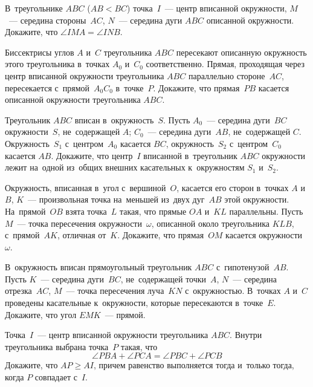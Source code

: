 \begin{problems}

\item
В~треугольнике $ABC$ ($AB < BC$) точка~$I$~--- центр вписанной окружности,
$M$~--- середина стороны~$AC$, $N$~--- середина дуги $ABC$ описанной
окружности.
Докажите, что $\angle IMA = \angle INB$.

\item
Биссектрисы углов $A$ и~$C$ треугольника $ABC$ пересекают описанную окружность
этого треугольника в~точках $A_0$ и~$C_0$ соответственно.
Прямая, проходящая через центр вписанной окружности треугольника $ABC$
параллельно стороне~$AC$, пересекается с~прямой~$A_0 C_0$ в~точке~$P$.
Докажите, что прямая~$PB$ касается описанной окружности треугольника $ABC$.

\item
Треугольник $ABC$ вписан в~окружность~$S$.
Пусть $A_0$~--- середина дуги~$BC$ окружности~$S$, не~содержащей $A$;
$C_0$~--- середина дуги~$AB$, не~содержащей $C$.
Окружность~$S_1$ с~центром~$A_0$ касается $BC$,
окружность~$S_2$ с~центром~$C_0$ касается $AB$.
Докажите, что центр~$I$ вписанной в~треугольник $ABC$ окружности лежит на~одной
из~общих внешних касательных к~окружностям $S_1$ и~$S_2$.

\item
Окружность, вписанная в~угол с~вершиной~$O$, касается его сторон в~точках
$A$ и~$B$,
$K$~--- произвольная точка на~меньшей из~двух дуг~$AB$ этой окружности.
На~прямой~$OB$ взята точка~$L$ такая, что прямые $OA$ и~$KL$ параллельны.
Пусть $M$~--- точка пересечения окружности~$\omega$, описанной около
треугольника $KLB$, с~прямой~$AK$, отличная от~$K$.
Докажите, что прямая~$OM$ касается окружности~$\omega$.

\item
В~окружность вписан прямоугольный треугольник $ABC$ с~гипотенузой~$AB$.
Пусть $K$~--- середина дуги~$BC$, не~содержащей точки~$A$,
$N$~--- середина отрезка~$AC$,
$M$~--- точка пересечения луча~$KN$ с~окружностью.
В~точках $A$ и~$C$ проведены касательные к~окружности, которые пересекаются
в~точке~$E$.
Докажите, что угол $EMK$~--- прямой.

\item
Точка~$I$~--- центр вписанной окружности треугольника $ABC$.
Внутри треугольника выбрана точка~$P$ такая,
что
\[
    \angle PBA + \angle PCA
=
    \angle PBC + \angle PCB
\]
Докажите, что $AP \geq AI$, причем равенство выполняется тогда и~только тогда,
когда $P$ совпадает с~$I$.


\end{problems}
